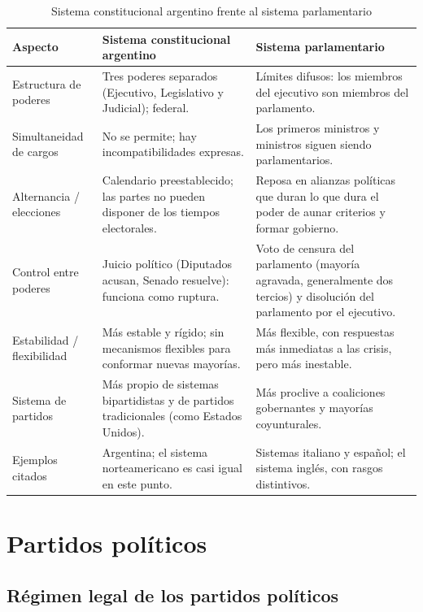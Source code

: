 \documentclass[12pt,oneside]{book}
\begin{document}
\begin{table}[H]
\centering
\caption{Sistema constitucional argentino frente al sistema parlamentario}
\begin{tabularx}{\textwidth}{>{\raggedright\arraybackslash}p{} X X}
\toprule
\textbf{Aspecto} & \textbf{Sistema constitucional argentino} & \textbf{Sistema parlamentario} \\
\midrule
Estructura de poderes & Tres poderes separados (Ejecutivo, Legislativo y Judicial); federal. & Límites difusos: los miembros del ejecutivo son miembros del parlamento. \\
Simultaneidad de cargos & No se permite; hay incompatibilidades expresas. & Los primeros ministros y ministros siguen siendo parlamentarios. \\
Alternancia / elecciones & Calendario preestablecido; las partes no pueden disponer de los tiempos electorales. & Reposa en alianzas políticas que duran lo que dura el poder de aunar criterios y formar gobierno. \\
Control entre poderes & Juicio político (Diputados acusan, Senado resuelve): funciona como ruptura. & Voto de censura del parlamento (mayoría agravada, generalmente dos tercios) y disolución del parlamento por el ejecutivo. \\
Estabilidad / flexibilidad & Más estable y rígido; sin mecanismos flexibles para conformar nuevas mayorías. & Más flexible, con respuestas más inmediatas a las crisis, pero más inestable. \\
Sistema de partidos & Más propio de sistemas bipartidistas y de partidos tradicionales (como Estados Unidos). & Más proclive a coaliciones gobernantes y mayorías coyunturales. \\
Ejemplos citados & Argentina; el sistema norteamericano es casi igual en este punto. & Sistemas italiano y español; el sistema inglés, con rasgos distintivos. \\
\bottomrule
\end{tabularx}
\end{table}

\chapter{Partidos políticos}

\section{Régimen legal de los partidos políticos}
\end{document}
